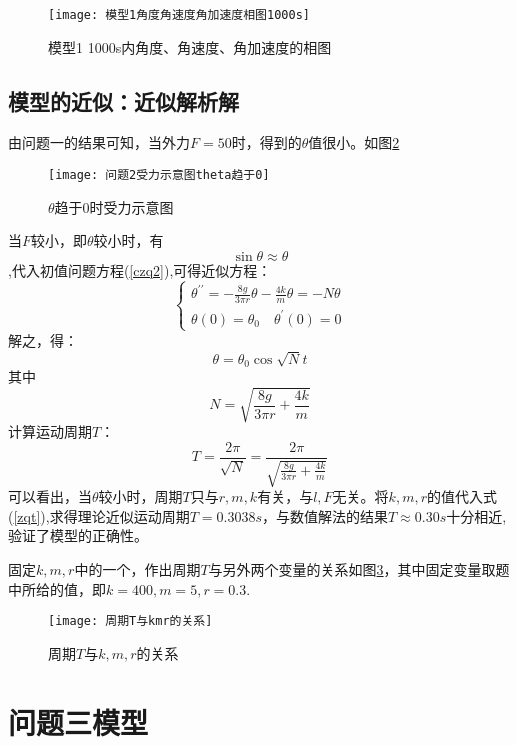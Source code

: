 \documentclass[withoutpreface,bwprint]{cumcmthesis} %
\begin{document}
 	\begin{figure}[H]
	\centering
	\texttt{[image: 模型1角度角速度角加速度相图1000s]}
	\caption{模型1 1000s内角度、角速度、角加速度的相图}
	\label{模型1角度角速度角加速度相图1000s}
	\end{figure}
	\subsection{模型的近似：近似解析解}
	由问题一的结果可知，当外力$F=50$时，得到的$\theta$值很小。如图\ref{问题2受力示意图theta趋于0}
	 \begin{figure}[H]
		\centering
		\texttt{[image: 问题2受力示意图theta趋于0]}
		\caption{$\theta$趋于0时受力示意图}
		\label{问题2受力示意图theta趋于0}
	\end{figure}
	
	当$F$较小，即$\theta$较小时，有$$\sin \theta \approx \theta$$,代入初值问题方程(\ref{czq2}),可得近似方程：
	\begin{equation}\label{jsfc}
	\left\{\begin{array}{l}
	\theta^{\prime \prime}=-\frac{8g}{3 \pi r} \theta-\frac{4 k}{m} \theta=-N \theta\\
	\theta(0)=\theta_{0} \quad \theta^{\prime}(0)=0
	\end{array}\right.
	\end{equation}
	解之，得：
	\begin{equation}\label{jg}
	\theta=\theta_{0} \cos \sqrt{N} t
	\end{equation}
	其中$$
	N=\sqrt{\frac{8g}{3\pi r}+\frac{4 k}{m}}$$
	计算运动周期$T$：
	\begin{equation}\label{zqt}
	T=\frac{2 \pi}{\sqrt{N}}=\frac{2 \pi}{\sqrt{\frac{8g}{3\pi r}+\frac{4 k}{m}}}
	\end{equation}
	可以看出，当$\theta$较小时，周期$T$只与$r,m,k$有关，与$l,F$无关。将$k,m,r$的值代入式(\ref{zqt}),求得理论近似运动周期$T=0.3038s$，与数值解法的结果$T\approx 0.30s$十分相近,验证了模型的正确性。
	
	固定$k,m,r$中的一个，作出周期$T$与另外两个变量的关系如图\ref{周期T与kmr的关系}，其中固定变量取题中所给的值，即$k=400,m=5,r=0.3$.
				 \begin{figure}[H]
		\centering
		\texttt{[image: 周期T与kmr的关系]}
		\caption{周期$T$与$k,m,r$的关系}
		\label{周期T与kmr的关系}
	\end{figure}
	

	\section{问题三模型}
\end{document}
